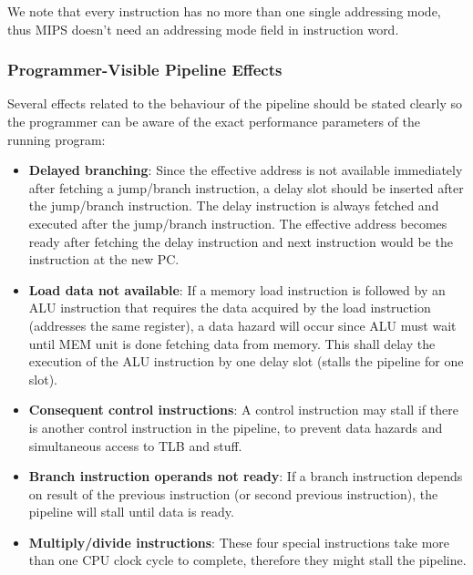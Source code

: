\documentclass[]{scrartcl}
\begin{document}
We note that every instruction has no more than one single addressing
mode, thus MIPS doesn't need an addressing mode field in instruction
word.

\subsubsection{Programmer-Visible Pipeline Effects}

Several effects related to the behaviour of the pipeline should be stated
clearly so the programmer can be aware of the exact performance parameters
of the running program:

\begin{itemize}

\item \textbf{Delayed branching}: Since the effective address is not available
      immediately after fetching a jump/branch instruction, a delay
      slot should be inserted after the jump/branch instruction. The
      delay instruction is always fetched and executed after the
      jump/branch instruction. The effective address becomes ready
      after fetching the delay instruction and next instruction
      would be the instruction at the new PC.

\item \textbf{Load data not available}: If a memory load instruction is
      followed by an ALU instruction that requires the data
      acquired by the load instruction (addresses the same
      register), a data hazard will occur since ALU must wait
      until MEM unit is done fetching data from memory. This
      shall delay the execution of the ALU instruction by
      one delay slot (stalls the pipeline for one slot).

\item \textbf{Consequent control instructions}: A control instruction
      may stall if there is another control instruction
      in the pipeline, to prevent data hazards and simultaneous
      access to TLB and stuff.

\item \textbf{Branch instruction operands not ready}:
      If a branch instruction depends on result of the previous
      instruction (or second previous instruction), the pipeline
      will stall until data is ready.

\item \textbf{Multiply/divide instructions}: These four special
      instructions take more than one CPU clock cycle to complete,
      therefore they might stall the pipeline.


\end{itemize}
\end{document}
